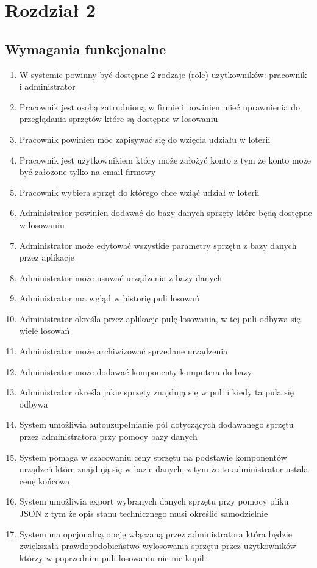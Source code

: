 \chapter{Rozdział 2}
\section{Wymagania funkcjonalne}
\begin{enumerate}
	\item W systemie powinny być dostępne 2 rodzaje (role) użytkowników: pracownik i administrator
	\item Pracownik jest osobą zatrudnioną w firmie i powinien mieć uprawnienia do przeglądania sprzętów które są dostępne w losowaniu
	\item Pracownik powinien móc zapisywać się do wzięcia udziału w loterii
	\item Pracownik jest użytkownikiem który może założyć konto z tym że konto może być założone tylko na email firmowy
	\item Pracownik wybiera sprzęt do którego chce wziąć udział w loterii
	\item Administrator powinien dodawać do bazy danych sprzęty które będą dostępne w losowaniu
	\item Administrator może edytować wszystkie parametry sprzętu z bazy danych przez aplikacje
	\item Administrator może usuwać urządzenia z bazy danych
	\item Administrator ma wgląd w historię puli losowań
	\item Administrator określa przez aplikacje pulę losowania, w tej puli odbywa się wiele losowań
	\item Administrator może archiwizować sprzedane urządzenia
	\item Administrator może dodawać komponenty komputera do bazy
	\item Administrator określa jakie sprzęty znajdują się w puli i kiedy ta pula się odbywa
	\item System umożliwia autouzupełnianie pól dotyczących dodawanego sprzętu przez administratora przy pomocy bazy danych
	\item System pomaga w szacowaniu ceny sprzętu na podstawie komponentów urządzeń które znajdują się w bazie danych, z tym że to administrator ustala cenę końcową
	\item System umożliwia export wybranych danych sprzętu przy pomocy pliku JSON z tym że opis stanu technicznego musi określić samodzielnie
	\item System ma opcjonalną opcję włączaną przez administratora która będzie zwiększała prawdopodobieństwo wylosowania sprzętu przez użytkowników którzy w poprzednim puli losowaniu nic nie kupili

\end{enumerate}
